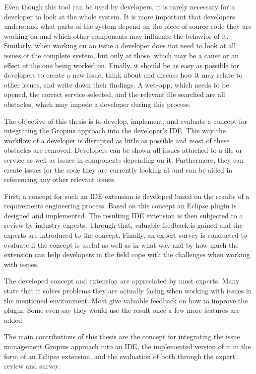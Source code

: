 Even though this tool can be used by developers, it is rarely necessary for a developer to look at the whole system. 
It is more important that developers understand what parts of the system depend on the piece of source code they are working on and which other components may influence the behavior of it. 
Similarly, when working on an issue a developer does not need to look at all issues of the complete system, but only at those, which may be a cause or an effect of the one being worked on. 
Finally, it should be as easy as possible for developers to create a new issue, think about and discuss how it may relate to other issues, and write down their findings.
A web-app,  which needs to be opened, the correct service selected, and the relevant file searched are all obstacles, which may impede a developer during this process. 

The objective of this thesis is to develop, implement, and evaluate a concept for integrating the \gls{Gropius} approach into the developer's \gls{IDE}.
This way the workflow of a developer is disrupted as little as possible and most of these obstacles are removed.
Developers can be shown all issues attached to a file or service as well as issues in components depending on it.
Furthermore, they can create issues for the code they are currently looking at and can be aided in referencing any other relevant issues.

First, a concept for such an \gls{IDE} extension is developed based on the results of a requirements engineering process.
Based on this concept an \gls{Eclipse} plugin is designed and implemented.
The resulting \gls{IDE} extension is then subjected to a review by industry experts.
Through that, valuable feedback is gained and the experts are introduced to the concept.
Finally, an expert survey is conducted to evaluate if the concept is useful 
as well as in what way and by how much the extension can help developers in the field cope with the challenges when working with issues.

The developed concept and extension are appreciated by most experts.
Many state that it solves problems they are actually facing when working with issues in the mentioned environment.
Most give valuable feedback on how to improve the plugin.
Some even say they would use the result once a few more features are added.

The main contributions of this thesis are the concept for integrating the issue management \gls{Gropius} approach into an \gls{IDE},
the implemented version of it in the form of an \gls{Eclipse} extension, and the evaluation of both through the expert review and survey.

